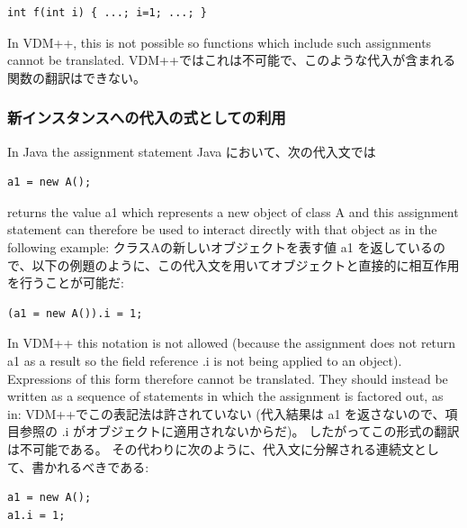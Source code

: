 \documentclass[\pformat,12pt]{jarticle}
\begin{document}
\begin{small}
\begin{verbatim}
int f(int i) { ...; i=1; ...; }
\end{verbatim}
\end{small}

In VDM++, this is not possible so functions which include such
assignments cannot be translated. 
VDM++ではこれは不可能で、このような代入が含まれる関数の翻訳はできない。

\subsubsection{新インスタンスへの代入の式としての利用}

In Java the assignment statement
Java において、次の代入文では

\begin{small}
\begin{verbatim}
a1 = new A();
\end{verbatim}
\end{small}

returns the value a1 which represents a new object of class A and this
assignment statement can therefore be used to interact directly with
that object as in the following example:
クラスAの新しいオブジェクトを表す値 a1 を返しているので、以下の例題のように、この代入文を用いてオブジェクトと直接的に相互作用を行うことが可能だ:

\begin{small}
\begin{verbatim}
(a1 = new A()).i = 1;
\end{verbatim}
\end{small}


In VDM++ this notation is not allowed (because the assignment does not
return a1 as a result so the field reference .i is not being applied
to an object). Expressions of this form therefore cannot be
translated. They should instead be written as a sequence of statements
in which the assignment is factored out, as in:
VDM++でこの表記法は許されていない (代入結果は a1 を返さないので、項目参照の .i がオブジェクトに適用されないからだ)。
したがってこの形式の翻訳は不可能である。
その代わりに次のように、代入文に分解される連続文として、書かれるべきである:

\begin{small}
\begin{verbatim}
a1 = new A();
a1.i = 1;
\end{verbatim}
\end{small}
\end{document}
